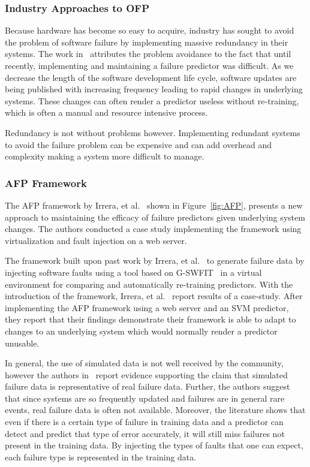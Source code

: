 \subsubsection{Industry Approaches to \ac{OFP}} \label{industry}
Because hardware has become so easy to acquire, industry has sought to avoid
the problem of software failure by implementing massive redundancy in their
systems.  The work in~\cite{irrera2015,watanabe2014} attributes the problem
avoidance to the fact that until recently, implementing and maintaining a
failure predictor was difficult.  As we decrease the length of the software
development life cycle, software updates are being published with increasing
frequency leading to rapid changes in underlying systems.  These changes can
often render a predictor useless without re-training, which is often a manual
and resource intensive process.

Redundancy is not without problems however.  Implementing redundant systems to
avoid the failure problem can be expensive and can add overhead and complexity
making a system more difficult to manage.

\subsubsection{\ac{AFP} Framework} \label{afp}
The \ac{AFP} framework by Irrera, et al.~\cite{irrera2015} shown in
Figure~\ref{fig:AFP}, presents a new approach to maintaining the efficacy of
failure predictors given underlying system changes.  The authors conducted a
case study implementing the framework using virtualization and fault injection
on a web server.  


The framework built upon past work by Irrera, et
al.~\cite{irrera2013,irrera2014} to generate failure data by injecting software
faults using a tool based on \ac{G-SWFIT}~\cite{gswfit} in a virtual
environment for comparing and automatically re-training predictors.  With the
introduction of the framework, Irrera, et al.~\cite{irrera2015} report results
of a case-study.  After implementing the \ac{AFP} framework using a web server
and an \ac{SVM} predictor, they report that their findings demonstrate their
framework is able to adapt to changes to an underlying system which would
normally render a predictor unusable.

In general, the use of simulated data is not well received by the community,
however the authors in~\cite{irrera2010,irrera2014} report evidence supporting
the claim that simulated failure data is representative of real failure data.
Further, the authors suggest that since systems are so frequently updated and
failures are in general rare events, real failure data is often not available.
Moreover, the literature shows that even if there is a certain type of failure
in training data and a predictor can detect and predict that type of error
accurately, it will still miss failures not present in the training data.  By
injecting the types of faults that one can expect, each failure type is
represented in the training data.

